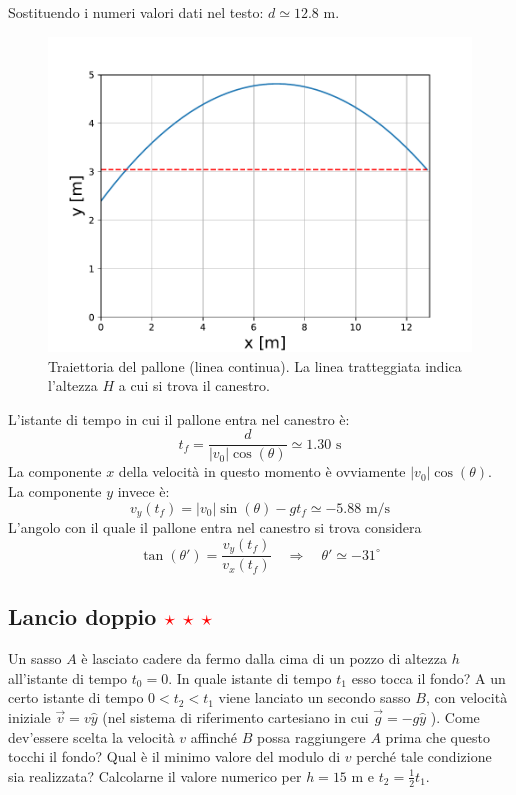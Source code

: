 \documentclass[12pt,a4paper]{book}
\newcommand{\rstar}{ \textcolor{red}{$\star$}}
\begin{document}
Sostituendo i numeri valori dati nel testo: $d \simeq 12.8$ m.
 \begin{figure}[!ht]
 \centering
\includegraphics[scale=0.55]{71.pdf}
\caption{Traiettoria del pallone (linea continua). La linea tratteggiata indica l'altezza $H$ a cui si trova il canestro.\label{fig:71} }
\end{figure}
L'istante di tempo in cui il pallone entra nel canestro è: 
%
\begin{equation*}
t_f=\frac{d}{|v_0|  \cos(\theta)} \simeq 1.30 \text{  s}
\end{equation*}
%
La componente $x$ della velocità in questo momento è ovviamente $|v_0| \cos(\theta)$. La componente $y$ invece è:
%
\begin{equation*}
v_y(t_f)= |v_0|  \sin(\theta) - g t_f  \simeq - 5.88 \text{  m/s}
\end{equation*}
%
L'angolo con il quale il pallone entra nel canestro si trova 
considera
%
\begin{equation*}
\tan(\theta')=\frac{v_y(t_f)}{v_x(t_f)} \quad \Rightarrow \quad \theta' \simeq - 31^\circ
\end{equation*}
%

\subsection{Lancio doppio \rstar\rstar\rstar}
Un sasso $A$ è lasciato cadere da fermo dalla cima di un pozzo di altezza $h$ all'istante di tempo $t_0=0$. In quale istante di tempo $t_1$ esso tocca il fondo? A un certo istante di tempo $0<t_2<t_1$ viene lanciato 
un secondo sasso $B$, con velocità iniziale $\vec{v}=v \hat{y}$ (nel sistema di riferimento cartesiano in cui $\vec{g}=-g\hat{y}$ ). Come  dev'essere scelta la velocità $v$ affinché $B$ possa raggiungere $A$ prima che questo tocchi il fondo? Qual è il minimo valore del modulo di $v$ perché tale condizione sia realizzata? Calcolarne il valore numerico per $h=15$ m e $t_2=\frac{1}{2}t_1$. 
\end{document}

